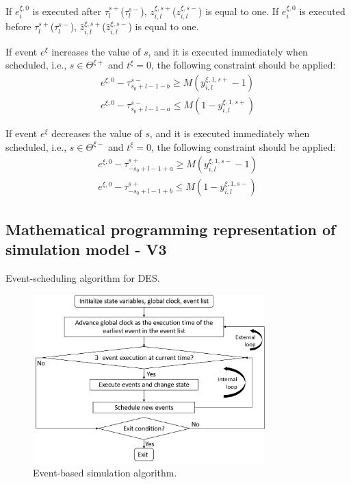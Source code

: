 \documentclass[]{interact}
\theoremstyle{plain}%
\theoremstyle{definition}
\theoremstyle{remark}
\begin{document}
If $e^{\xi,0}_{i}$ is executed after $\tau_{l}^{s+}$($\tau_{l}^{s-}$), $z^{\xi,s+}_{i,l}$($z^{\xi,s-}_{i,l}$) is equal to one. If $e^{\xi,0}_{i}$ is executed before $\tau_{l}^{s+}$($\tau_{l}^{s-}$), $\hat{z}^{\xi,s+}_{i,l}$($\hat{z}^{\xi,s-}_{i,l}$) is equal to one.


If event $e^{\xi}$ increases the value of $s$, and it is executed immediately when scheduled, i.e., $s\in \Theta^{\xi+}$ and $t^{\xi}=0$, the following constraint should be applied:
\begin{eqnarray}
e^{\xi,0} - \tau^{s-}_{s_0+l-1-b} \ge M(y^{\xi,1,s+}_{i,l}-1)\\
e^{\xi,0} - \tau^{s-}_{s_0+l-1-a} \le M(1-y^{\xi,1,s+}_{i,l})
\end{eqnarray}

If event $e^{\xi}$ decreases the value of $s$, and it is executed immediately when scheduled, i.e., $s\in \Theta^{\xi-}$ and $t^{\xi}=0$, the following constraint should be applied:
\begin{eqnarray}
e^{\xi,0} - \tau^{s+}_{-s_0+l-1+a} \ge M(y^{\xi,1,s-}_{i,l}-1)\\
e^{\xi,0} - \tau^{s+}_{-s_0+l-1+b} \le M(1-y^{\xi,1,s-}_{i,l})
\end{eqnarray}



\newpage
\subsection{Mathematical programming representation of simulation model - V3}
Event-scheduling algorithm for DES. 

\begin{figure}[h]
	\centering
	\includegraphics[width=0.8\textwidth]{Figures/EventSimAlgo.png}
	\caption{Event-based simulation algorithm.}
\end{figure}
\end{document}
